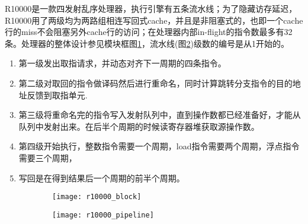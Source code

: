 R10000是一款四发射乱序处理器，执行引擎有五条流水线；为了隐藏访存延迟，R10000用了两级均为两路组相连写回式cache，并且是非阻塞式的，也即一个cache行的miss不会阻塞另外cache行的访问；在处理器内部in-flight的指令数最多有32条\citep{MIPS1996}。处理器的整体设计参见模块框图\ref{fig:r10000_block}，流水线(图\ref{fig:r10000_pipeline})级数的编号是从1开始的。
\begin{enumerate}[label=(\arabic*)]
	\item 第一级发出取指请求，并动态对齐下一周期的四条指令。
	\item 第二级对取回的指令做译码然后进行重命名，同时计算跳转分支指令的目的地址反馈到取指单元.
	\item 第三级将重命名完的指令写入发射队列中，直到操作数都已经准备好，才能从队列中发射出来。在后半个周期的时候读寄存器堆获取源操作数。
	\item 第四级开始执行，整数指令需要一个周期，load指令需要两个周期，浮点指令需要三个周期，
	\item 写回是在得到结果后一个周期的前半个周期。
\end{enumerate}
\begin{figure}[!htbp]
\centering
\begin{subfigure}[b]{0.7\textwidth}
	\texttt{[image: r10000\_block]}
	\caption{}
	\label{fig:r10000_block}
\end{subfigure}
\begin{subfigure}[b]{0.7\textwidth}
	\texttt{[image: r10000\_pipeline]}
	\caption{}
	\label{fig:r10000_pipeline}
\end{subfigure}
\label{fig:r10000_total}
\end{figure}

